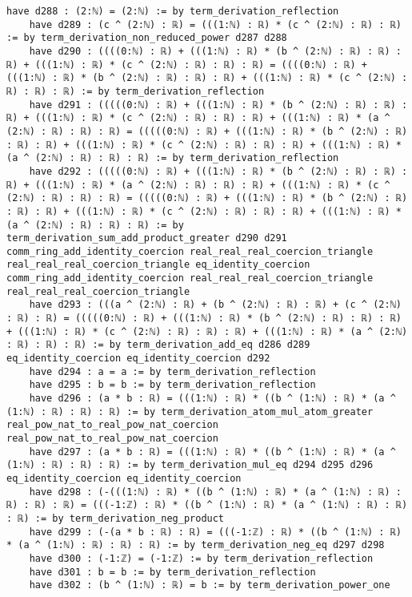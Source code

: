 \documentclass{article}
\begin{document}
\begin{tcolorbox}[colback=white!10, width=\linewidth]
\begin{lstlisting}[language=Lean4]
    have d288 : (2:ℕ) = (2:ℕ) := by term_derivation_reflection
    have d289 : (c ^ (2:ℕ) : ℝ) = (((1:ℕ) : ℝ) * (c ^ (2:ℕ) : ℝ) : ℝ) := by term_derivation_non_reduced_power d287 d288
    have d290 : ((((0:ℕ) : ℝ) + (((1:ℕ) : ℝ) * (b ^ (2:ℕ) : ℝ) : ℝ) : ℝ) + (((1:ℕ) : ℝ) * (c ^ (2:ℕ) : ℝ) : ℝ) : ℝ) = ((((0:ℕ) : ℝ) + (((1:ℕ) : ℝ) * (b ^ (2:ℕ) : ℝ) : ℝ) : ℝ) + (((1:ℕ) : ℝ) * (c ^ (2:ℕ) : ℝ) : ℝ) : ℝ) := by term_derivation_reflection
    have d291 : (((((0:ℕ) : ℝ) + (((1:ℕ) : ℝ) * (b ^ (2:ℕ) : ℝ) : ℝ) : ℝ) + (((1:ℕ) : ℝ) * (c ^ (2:ℕ) : ℝ) : ℝ) : ℝ) + (((1:ℕ) : ℝ) * (a ^ (2:ℕ) : ℝ) : ℝ) : ℝ) = (((((0:ℕ) : ℝ) + (((1:ℕ) : ℝ) * (b ^ (2:ℕ) : ℝ) : ℝ) : ℝ) + (((1:ℕ) : ℝ) * (c ^ (2:ℕ) : ℝ) : ℝ) : ℝ) + (((1:ℕ) : ℝ) * (a ^ (2:ℕ) : ℝ) : ℝ) : ℝ) := by term_derivation_reflection
    have d292 : (((((0:ℕ) : ℝ) + (((1:ℕ) : ℝ) * (b ^ (2:ℕ) : ℝ) : ℝ) : ℝ) + (((1:ℕ) : ℝ) * (a ^ (2:ℕ) : ℝ) : ℝ) : ℝ) + (((1:ℕ) : ℝ) * (c ^ (2:ℕ) : ℝ) : ℝ) : ℝ) = (((((0:ℕ) : ℝ) + (((1:ℕ) : ℝ) * (b ^ (2:ℕ) : ℝ) : ℝ) : ℝ) + (((1:ℕ) : ℝ) * (c ^ (2:ℕ) : ℝ) : ℝ) : ℝ) + (((1:ℕ) : ℝ) * (a ^ (2:ℕ) : ℝ) : ℝ) : ℝ) := by term_derivation_sum_add_product_greater d290 d291 comm_ring_add_identity_coercion real_real_real_coercion_triangle real_real_real_coercion_triangle eq_identity_coercion comm_ring_add_identity_coercion real_real_real_coercion_triangle real_real_real_coercion_triangle
    have d293 : (((a ^ (2:ℕ) : ℝ) + (b ^ (2:ℕ) : ℝ) : ℝ) + (c ^ (2:ℕ) : ℝ) : ℝ) = (((((0:ℕ) : ℝ) + (((1:ℕ) : ℝ) * (b ^ (2:ℕ) : ℝ) : ℝ) : ℝ) + (((1:ℕ) : ℝ) * (c ^ (2:ℕ) : ℝ) : ℝ) : ℝ) + (((1:ℕ) : ℝ) * (a ^ (2:ℕ) : ℝ) : ℝ) : ℝ) := by term_derivation_add_eq d286 d289 eq_identity_coercion eq_identity_coercion d292
    have d294 : a = a := by term_derivation_reflection
    have d295 : b = b := by term_derivation_reflection
    have d296 : (a * b : ℝ) = (((1:ℕ) : ℝ) * ((b ^ (1:ℕ) : ℝ) * (a ^ (1:ℕ) : ℝ) : ℝ) : ℝ) := by term_derivation_atom_mul_atom_greater real_pow_nat_to_real_pow_nat_coercion real_pow_nat_to_real_pow_nat_coercion
    have d297 : (a * b : ℝ) = (((1:ℕ) : ℝ) * ((b ^ (1:ℕ) : ℝ) * (a ^ (1:ℕ) : ℝ) : ℝ) : ℝ) := by term_derivation_mul_eq d294 d295 d296 eq_identity_coercion eq_identity_coercion
    have d298 : (-(((1:ℕ) : ℝ) * ((b ^ (1:ℕ) : ℝ) * (a ^ (1:ℕ) : ℝ) : ℝ) : ℝ) : ℝ) = (((-1:ℤ) : ℝ) * ((b ^ (1:ℕ) : ℝ) * (a ^ (1:ℕ) : ℝ) : ℝ) : ℝ) := by term_derivation_neg_product
    have d299 : (-(a * b : ℝ) : ℝ) = (((-1:ℤ) : ℝ) * ((b ^ (1:ℕ) : ℝ) * (a ^ (1:ℕ) : ℝ) : ℝ) : ℝ) := by term_derivation_neg_eq d297 d298
    have d300 : (-1:ℤ) = (-1:ℤ) := by term_derivation_reflection
    have d301 : b = b := by term_derivation_reflection
    have d302 : (b ^ (1:ℕ) : ℝ) = b := by term_derivation_power_one

\end{lstlisting}
\end{tcolorbox}
\end{document}

